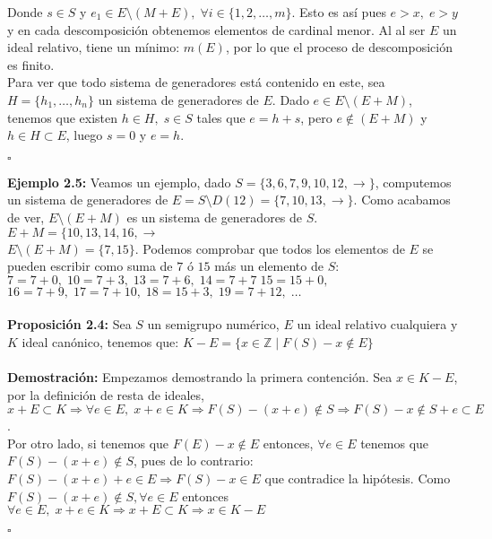 \documentclass[11pt,spanish]{book}
\newcommand{\qed}{\begin{flushright} $\square$ \end{flushright}}
\begin{document}
Donde $s\in S$ y $e_{1}\in E\setminus(M+E),\; \forall i\in\{1,2,\ldots,m\}$. Esto es así pues $e>x,\; e>y$ y en cada descomposición obtenemos elementos de cardinal menor. Al al ser $E$ un ideal relativo, tiene un mínimo: $m(E)$, por lo que el proceso de descomposición es finito.\\

Para ver que todo sistema de generadores está contenido en este, sea $H=\{h_{1},\ldots,h_{n}\}$ un sistema de generadores de $E$. Dado $e\in E\setminus(E+M)$, tenemos que existen $h\in H,\; s\in S$ tales que $e=h+s$, pero $e \notin (E+M)$ y $h\in H\subset E$, luego $s=0$ y $e=h$.
\qed
\textbf{Ejemplo 2.5:}
Veamos un ejemplo, dado $S=\{3,6,7,9,10,12,\rightarrow\}$, computemos un sistema de generadores de $E=S\setminus D(12)=\{7,10,13,\rightarrow\}$. Como acabamos de ver, $E\setminus (E+M)$ es un sistema de generadores de $S$. $E+M=\{10,13,14,16,\rightarrow$\\
$E\setminus (E+M)=\{7,15\}$.
Podemos comprobar que todos los elementos de $E$ se pueden escribir como suma de $7$ ó $15$ más un elemento de $S$:\\
$7=7+0,\; 10=7+3,\; 13=7+6,\; 14 =7+7 \; 15=15+0,\;$\\
$16=7+9,\; 17=7+10,\; 18=15+3,\;19=7+12,\;\ldots$
\\
\\ \textbf{Proposición 2.4: } Sea $S$ un semigrupo numérico, $E$ un ideal relativo cualquiera y $K$ ideal canónico, tenemos que: $K-E=\{x\in \mathbb{Z}\;|\; F(S)-x\notin E\}$\\
\\ \textbf{Demostración: } Empezamos demostrando la primera contención. Sea $x\in K-E$, por la definición de resta de ideales, $x+E\subset K\Rightarrow \forall e\in E,\; x+e\in K\Rightarrow F(S)-(x+e)\notin S\Rightarrow F(S)-x\notin S+e\subset E$.\\

Por otro lado, si tenemos que $F(E)-x\notin E$ entonces, $\forall e\in E$ tenemos que $F(S)-(x+e)\notin S$, pues de lo contrario: $F(S)-(x+e) + e\in E\Rightarrow F(S)-x\in E$ que contradice la hipótesis. Como $F(S)-(x+e)\notin S, \forall e\in E$ entonces $\forall e\in E,\; x+e\in K\Rightarrow x+E\subset K\Rightarrow x\in K-E$
\qed
\end{document}
